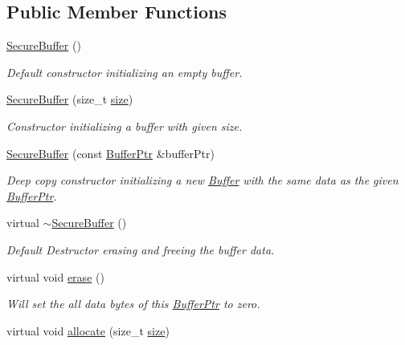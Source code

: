 \subsection*{Public Member Functions}
\begin{DoxyCompactItemize}
\item 
\hyperlink{class_gost_crypt_1_1_secure_buffer_a46bb20b44902e5722a7175e806e1b237}{Secure\+Buffer} ()
\begin{DoxyCompactList}\small\item\em Default constructor initializing an empty buffer. \end{DoxyCompactList}\item 
\hyperlink{class_gost_crypt_1_1_secure_buffer_a5e918227d8d7c3acc9e061da822788c0}{Secure\+Buffer} (size\+\_\+t \hyperlink{class_gost_crypt_1_1_buffer_a5324726029e7f906f2f14e54eeb1ab82}{size})
\begin{DoxyCompactList}\small\item\em Constructor initializing a buffer with given size. \end{DoxyCompactList}\item 
\hyperlink{class_gost_crypt_1_1_secure_buffer_a316949816e1e009ad9a23e48525e74ef}{Secure\+Buffer} (const \hyperlink{class_gost_crypt_1_1_buffer_ptr}{Buffer\+Ptr} \&buffer\+Ptr)
\begin{DoxyCompactList}\small\item\em Deep copy constructor initializing a new \hyperlink{class_gost_crypt_1_1_buffer}{Buffer} with the same data as the given \hyperlink{class_gost_crypt_1_1_buffer_ptr}{Buffer\+Ptr}. \end{DoxyCompactList}\item 
virtual \hyperlink{class_gost_crypt_1_1_secure_buffer_aad073740f34b317eb77a57c841919a60}{$\sim$\+Secure\+Buffer} ()
\begin{DoxyCompactList}\small\item\em Default Destructor erasing and freeing the buffer data. \end{DoxyCompactList}\item 
virtual void \hyperlink{class_gost_crypt_1_1_secure_buffer_a6b6ee17fb3f8f617112854f9d24e393a}{erase} ()
\begin{DoxyCompactList}\small\item\em Will set the all data bytes of this \hyperlink{class_gost_crypt_1_1_buffer_ptr}{Buffer\+Ptr} to zero. \end{DoxyCompactList}\item 
virtual void \hyperlink{class_gost_crypt_1_1_secure_buffer_a832c1af234c29e1dc1521fed24d3265a}{allocate} (size\+\_\+t \hyperlink{class_gost_crypt_1_1_buffer_a5324726029e7f906f2f14e54eeb1ab82}{size})

\end{DoxyCompactItemize}
